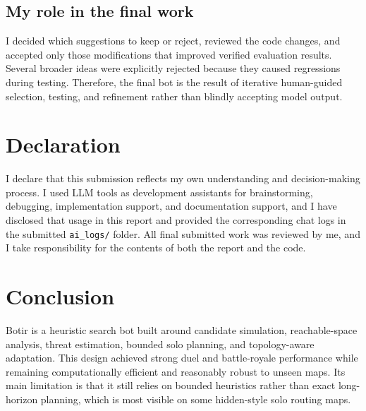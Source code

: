 \documentclass[11pt,a4paper]{article}
\begin{document}
\subsection{My role in the final work}
I decided which suggestions to keep or reject, reviewed the code changes, and accepted only those modifications that improved verified evaluation results. Several broader ideas were explicitly rejected because they caused regressions during testing. Therefore, the final bot is the result of iterative human-guided selection, testing, and refinement rather than blindly accepting model output.

\section{Declaration}
I declare that this submission reflects my own understanding and decision-making process. I used LLM tools as development assistants for brainstorming, debugging, implementation support, and documentation support, and I have disclosed that usage in this report and provided the corresponding chat logs in the submitted \texttt{ai\_logs/} folder. All final submitted work was reviewed by me, and I take responsibility for the contents of both the report and the code.

\section{Conclusion}
Botir is a heuristic search bot built around candidate simulation, reachable-space analysis, threat estimation, bounded solo planning, and topology-aware adaptation. This design achieved strong duel and battle-royale performance while remaining computationally efficient and reasonably robust to unseen maps. Its main limitation is that it still relies on bounded heuristics rather than exact long-horizon planning, which is most visible on some hidden-style solo routing maps.
\end{document}
